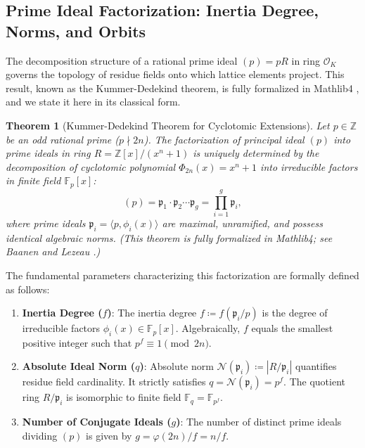 \documentclass[11pt,a4paper]{article}
\theoremstyle{plain}
\newtheorem{teorema}{Theorem}[section]
\theoremstyle{definition}
\numberwithin{equation}{section}
\newcommand{\ZZ}{\mathbb{Z}}
\newcommand{\FF}{\mathbb{F}}
\newcommand{\cO}{\mathcal{O}}
\newcommand{\cN}{\mathcal{N}}
\newcommand{\fkp}{\mathfrak{p}}
\begin{document}
\subsection{Prime Ideal Factorization: Inertia Degree, Norms, and Orbits}

The decomposition structure of a rational prime ideal $(p) = pR$ in ring $\cO_K$ governs the topology of residue fields onto which lattice elements project. This result, known as the Kummer-Dedekind theorem, is fully formalized in Mathlib4 \cite{Baanen2021}, and we state it here in its classical form.

\begin{teorema}[Kummer-Dedekind Theorem for Cyclotomic Extensions]
\label{teo:kummer_dedekind}
Let $p \in \ZZ$ be an odd rational prime ($p \nmid 2n$). The factorization of principal ideal $(p)$ into prime ideals in ring $R = \ZZ[x]/(x^n+1)$ is uniquely determined by the decomposition of cyclotomic polynomial $\Phi_{2n}(x) = x^n + 1$ into irreducible factors in finite field $\FF_p[x]$:
\begin{equation}
(p) = \fkp_1 \cdot \fkp_2 \cdots \fkp_g = \prod_{i=1}^{g} \fkp_i,
\end{equation}
where prime ideals $\fkp_i = \langle p, \phi_i(x) \rangle$ are maximal, unramified, and possess identical algebraic norms. (This theorem is fully formalized in Mathlib4; see Baanen and Lezeau \cite{Baanen2021}.)
\end{teorema}

The fundamental parameters characterizing this factorization are formally defined as follows:

\begin{enumerate}
    \item \textbf{Inertia Degree ($f$)}: The inertia degree $f \coloneqq f(\fkp_i/p)$ is the degree of irreducible factors $\phi_i(x) \in \FF_p[x]$. Algebraically, $f$ equals the smallest positive integer such that $p^f \equiv 1 \pmod{2n}$.
    
    \item \textbf{Absolute Ideal Norm ($q$)}: Absolute norm $\cN(\fkp_i) \coloneqq |R/\fkp_i|$ quantifies residue field cardinality. It strictly satisfies $q = \cN(\fkp_i) = p^f$. The quotient ring $R/\fkp_i$ is isomorphic to finite field $\FF_q = \FF_{p^f}$.

    \item \textbf{Number of Conjugate Ideals ($g$)}: The number of distinct prime ideals dividing $(p)$ is given by $g = \varphi(2n)/f = n/f$.
\end{enumerate}
\end{document}
